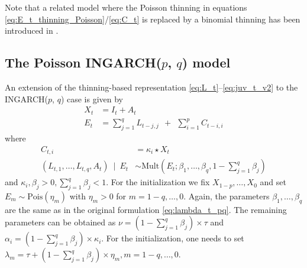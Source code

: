 \documentclass{article}
\begin{document}
Note that a related model where the Poisson thinning in equations \eqref{eq:E_t_thinning_Poisson}/\eqref{eq:C_t} is replaced by a binomial thinning has been introduced in \cite{Bracher2019}.

\subsection{The Poisson INGARCH($p$, $q$) model}
\label{subsec:poissonpq}

An extension of the thinning-based representation \eqref{eq:L_t}--\eqref{eq:juv_t_v2} to the INGARCH($p$, $q$) case is given by
\begin{align}
X_t & = I_t + A_t \label{eq:Xt_thinning_pq}\\
E_t & = \sum_{j = 1}^q L_{t - j, j} \ \ + \ \ \sum_{i = 1}^p C_{t - i, i}
\end{align}
where
\begin{align}
C_{t, i} & = \kappa_i \star X_t\\
(L_{t, 1}, \dots, L_{t, q}, A_t) \ \mid \ E_t & \sim \text{Mult}\left(E_t; \beta_1, \dots, \beta_q, 1 - \sum_{j = 1}^q \beta_j\right)\label{eq:L_t_mult}
\end{align}
and $\kappa_i, \beta_j > 0, \sum_{j = 1}^q \beta_j < 1$. For the initialization we fix $X_{1 - p}, \dots, X_0$ and set $E_{m} \sim \text{Pois}(\eta_m)$ with $\eta_m > 0$ for $m = 1 - q, \dots, 0$. Again, the parameters $\beta_{1}, \dots, \beta_q$ are the same as in the original formulation \eqref{eq:lambda_t_pq}. The remaining parameters can be obtained as $\nu = \left(1 - \sum_{j = 1}^q\beta_j \right) \times \tau$ and $\alpha_i = \left(1 - \sum_{j = 1}^q\beta_j \right) \times \kappa_i$. For the initialization, one needs to set $\lambda_m = \tau + (1 - \sum_{j = 1}^q\beta_j) \times \eta_m, m = 1 - q, \dots, 0$.
\end{document}
